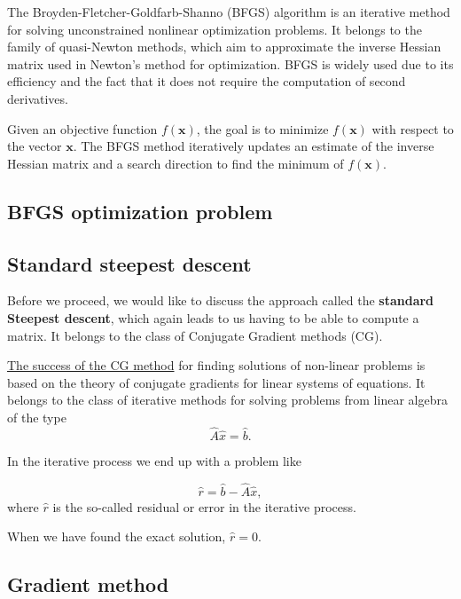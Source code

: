 \documentclass[%
oneside,                 %
final,                   %
10pt]{article}
\begin{document}
The Broyden-Fletcher-Goldfarb-Shanno (BFGS) algorithm is an iterative
method for solving unconstrained nonlinear optimization problems. It
belongs to the family of quasi-Newton methods, which aim to
approximate the inverse Hessian matrix used in Newton's method for
optimization. BFGS is widely used due to its efficiency and the fact
that it does not require the computation of second derivatives.

Given an objective function \( f(\mathbf{x}) \), the goal is to
minimize \( f(\mathbf{x}) \) with respect to the vector \( \mathbf{x}
\). The BFGS method iteratively updates an estimate of the inverse
Hessian matrix and a search direction to find the minimum of \(
f(\mathbf{x}) \).

\subsection*{BFGS optimization problem}

\subsection*{Standard steepest descent}

Before we proceed, we would like to discuss the approach called the
\textbf{standard Steepest descent}, which again leads to us having to be able
to compute a matrix. It belongs to the class of Conjugate Gradient methods (CG).

\href{{https://www.cs.cmu.edu/~quake-papers/painless-conjugate-gradient.pdf}}{The success of the CG method}
for finding solutions of non-linear problems is based on the theory
of conjugate gradients for linear systems of equations. It belongs to
the class of iterative methods for solving problems from linear
algebra of the type 
\begin{equation*} 
\hat{A}\hat{x} = \hat{b}.
\end{equation*} 

In the iterative process we end up with a problem like

\begin{equation*}
  \hat{r}= \hat{b}-\hat{A}\hat{x},
\end{equation*}
where $\hat{r}$ is the so-called residual or error in the iterative process.

When we have found the exact solution, $\hat{r}=0$.

\subsection*{Gradient method}
\end{document}
